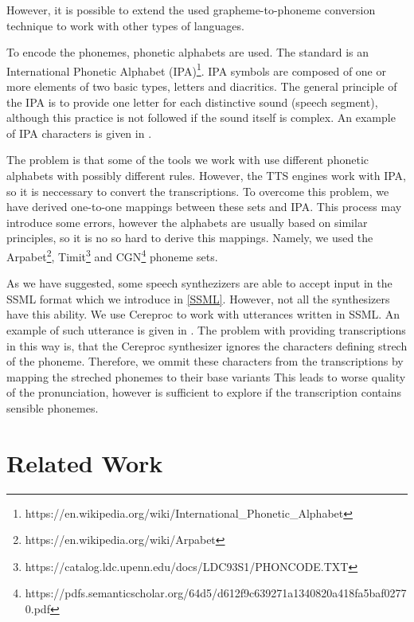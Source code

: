 However, it is possible to extend the used grapheme-to-phoneme conversion technique \cite{bisani2008joint} to work with other types of languages.
\par
To encode the phonemes, phonetic alphabets are used.
The standard is an International Phonetic Alphabet (IPA)\footnote{https://en.wikipedia.org/wiki/International\_Phonetic\_Alphabet}.
IPA symbols are composed of one or more elements of two basic types, letters and diacritics.
The general principle of the IPA is to provide one letter for each distinctive sound (speech segment), although this practice is not followed if the sound itself is complex.
An example of IPA characters is given in .
\par
The problem is that some of the tools we work with use different phonetic alphabets with possibly different rules.
However, the TTS engines work with IPA, so it is neccessary to convert the transcriptions.
To overcome this problem, we have derived one-to-one mappings between these sets and IPA.
This process may introduce some errors, however the alphabets are usually based on similar principles, so it is no so hard to derive this mappings.
Namely, we used the Arpabet\footnote{https://en.wikipedia.org/wiki/Arpabet}, Timit\footnote{https://catalog.ldc.upenn.edu/docs/LDC93S1/PHONCODE.TXT} and CGN\footnote{https://pdfs.semanticscholar.org/64d5/d612f9c639271a1340820a418fa5baf02770.pdf} phoneme sets.
\par
As we have suggested, some speech synthezizers are able to accept input in the SSML format which we introduce in \ref{SSML}.
However, not all the synthesizers have this ability.
We use Cereproc to work with utterances written in SSML.
An example of such utterance is given in .
The problem with providing transcriptions in this way is, that the Cereproc synthesizer ignores the characters defining strech of the phoneme.
Therefore, we ommit these characters from the transcriptions by mapping the streched phonemes to their base variants
This leads to worse quality of the pronunciation, however is sufficient to explore if the transcription contains sensible phonemes.
\pagebreak
\section{Related Work}
\label{relatedwork}
